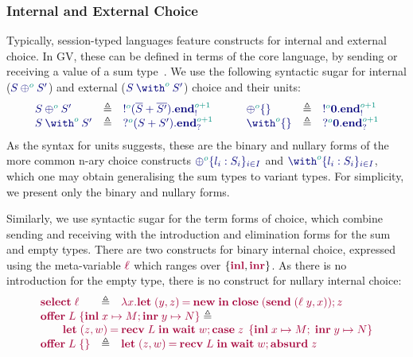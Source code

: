 \documentclass[main.tex]{subfiles}
\begin{document}
\subsubsection*{Internal and External Choice}
Typically, session-typed languages feature constructs for internal and external choice. In GV, these can be defined in terms of the core language, by sending or receiving a value of a sum type~\cite{lindleymorris15}. We use the following syntactic sugar for internal ($\ty{\tyselect[\cs{o}]{S}{S'}}$) and external ($\ty{\tyoffer[\cs{o}]{S}{S'}}$) choice and their units:
\[
\begin{array}{lcl}
  \ty{\tyselect[\cs{o}]{S}{S'}}
  & \elabarrow & \ty{\tysend[\cs{o}]{(\tysum{\co{S}}{\co{S'}})}{\tyends[\cs{o+1}]}} \\
  \ty{\tyoffer[\cs{o}]{S}{S'}}
  & \elabarrow & \ty{\tyrecv[\cs{o}]{(\tysum{S}{S'})}{\tyendr[\cs{o+1}]}} \\
\end{array}
\qquad
\begin{array}{lcl}
  \ty{\tyselectemp[\cs{o}]}
  & \elabarrow & \ty{\tysend[\cs{o}]{\tyvoid}{\tyends[\cs{o+1}]}} \\
  \ty{\tyofferemp[\cs{o}]}
  & \elabarrow & \ty{\tyrecv[\cs{o}]{\tyvoid}{\tyendr[\cs{o+1}]}} \\
\end{array}
\]
As the syntax for units suggests, these are the binary and nullary forms of the more common n-ary choice constructs $\ty{{\oplus}^{\cs{o}}\{l_i:S_i\}_{i\in{I}}}$ and $\ty{{\with}^{\cs{o}}\{l_i:S_i\}_{i\in{I}}}$, which one may obtain generalising the sum types to variant types. For simplicity, we present only the binary and nullary forms.

Similarly, we use syntactic sugar for the term forms of choice, which combine sending and receiving with the introduction and elimination forms for the sum and empty types. There are two constructs for binary internal choice, expressed using the meta-variable $\tm{\ell}$ which ranges over $\{\tm{\labinl},\tm{\labinr}\}$. As there is no introduction for the empty type, there is no construct for nullary internal choice:
\[
\begin{array}{lcl}
  \tm{\select{\ell}}
  & \elabarrow
  & \tm{\lambda x.\letpair{y}{z}{\new}{\andthen{\close\;(\send\;{\pair{\ell\;y}{x}})}{z}}}
  \\
  \multicolumn{3}{l}{%
  \tm{\offer{L}{x}{M}{y}{N}}\elabarrow}
  \\
  \multicolumn{3}{l}{%
  \qquad\tm{\letpair{z}{w}{\recv\;{L}}{\andthen{\wait\;{w}}{\casesum{z}{x}{M}{y}{N}}}}}
  \\
  \tm{\offeremp{L}}
  & \elabarrow
  & \tm{\letpair{z}{w}{\recv\;L}{\andthen{\wait\;{w}}{\absurd{z}}}}
\end{array}
\]
\end{document}
